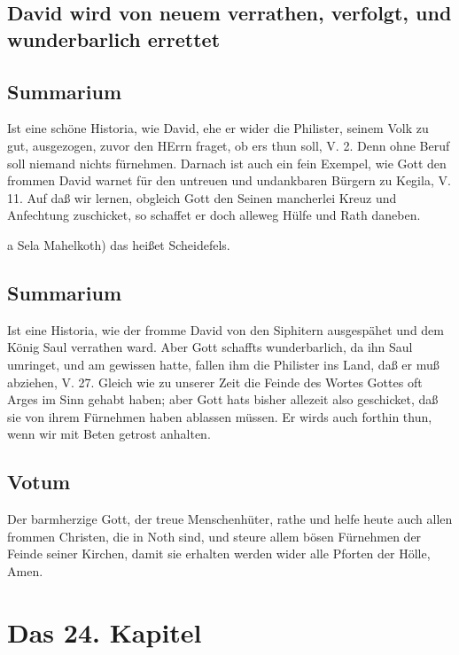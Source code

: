 \section[David wird von neuem verrathen, verfolgt, und wunderbarlich]{David wird von neuem verrathen, verfolgt, und wunderbarlich errettet}

\section{Summarium}

Ist eine schöne Historia, wie David, ehe er
wider die Philister, seinem Volk zu gut, ausgezogen, zuvor den HErrn fraget, ob ers thun soll, V. 2. Denn ohne Beruf soll niemand nichts fürnehmen. Darnach ist auch ein fein Exempel, wie Gott den frommen David warnet für den untreuen und undankbaren Bürgern zu Kegila, V. 11. Auf daß wir lernen, obgleich Gott den Seinen mancherlei Kreuz und Anfechtung zuschicket, so schaffet er doch alleweg Hülfe und Rath daneben.

a Sela Mahelkoth) das heißet Scheidefels.

\section{Summarium}

Ist eine Historia, wie der fromme David von den Siphitern ausgespähet und dem König Saul verrathen ward. Aber Gott schaffts wunderbarlich, da ihn Saul umringet, und am gewissen hatte, fallen ihm die Philister ins Land, daß er muß abziehen, V. 27. Gleich wie zu unserer Zeit die Feinde des Wortes Gottes oft Arges im Sinn gehabt haben; aber Gott hats bisher allezeit also geschicket, daß sie von ihrem Fürnehmen haben ablassen müssen. Er wirds auch forthin thun, wenn wir mit Beten getrost anhalten.

\section{Votum}

Der barmherzige Gott, der treue Menschenhüter, rathe und helfe heute auch allen frommen Christen, die in Noth sind, und steure allem bösen Fürnehmen der Feinde seiner Kirchen, damit sie erhalten werden wider alle Pforten der Hölle, Amen.

\chapter{Das 24. Kapitel}

